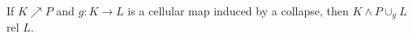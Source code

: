 If $K \nearrow P$ and $g: K \to L$ is a cellular map induced by a collapse, then $K \wedge P \cup_g L$ rel $L$.

